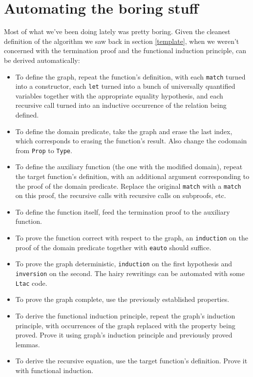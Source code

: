 \documentclass[declaration,mgr,english,shortabstract]{iithesis}
\newcommand{\m}[1]{\texttt{#1}}
\begin{document}
\section{Automating the boring stuff} \label{automate}

Most of what we've been doing lately was pretty boring. Given the cleanest definition of the algorithm we saw back in section \ref{template}, when we weren't concerned with the termination proof and the functional induction principle, can be derived automatically:

\begin{itemize}
    \item To define the graph, repeat the function's definition, with each \m{match} turned into a constructor, each \m{let} turned into a bunch of universally quantified variables together with the appropriate equality hypothesis, and each recursive call turned into an inductive occurrence of the relation being defined.
    \item To define the domain predicate, take the graph and erase the last index, which corresponds to erasing the function's result. Also change the codomain from \m{Prop} to \m{Type}.
    \item To define the auxiliary function (the one with the modified domain), repeat the target function's definition, with an additional argument corresponding to the proof of the domain predicate. Replace the original \m{match} with a \m{match} on this proof, the recursive calls with recursive calls on subproofs, etc.
    \item To define the function itself, feed the termination proof to the auxiliary function.
    \item To prove the function correct with respect to the graph, an \m{induction} on the proof of the domain predicate together with \m{eauto} should suffice.
    \item To prove the graph deterministic, \m{induction} on the first hypothesis and \m{inversion} on the second. The hairy rewritings can be automated with some \m{Ltac} code.
    \item To prove the graph complete, use the previously established properties.
    \item To derive the functional induction principle, repeat the graph's induction principle, with occurrences of the graph replaced with the property being proved. Prove it using graph's induction principle and previously proved lemmas.
    \item To derive the recursive equation, use the target function's definition. Prove it with functional induction.
\end{itemize}
\end{document}
